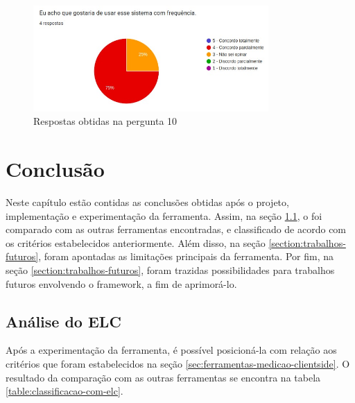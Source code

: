 \documentclass[12pt]{tcc}
\begin{document}
	\begin{figure}[!ht]
		\centering
		\includegraphics[width=0.8\textwidth]{figures/respostas-pergunta-10.jpeg}
		\caption{Respostas obtidas na pergunta 10}
		\label{fig:respostas-pergunta-10}
	\end{figure}

\chapter{Conclusão}
	\label{cap:conclusão}

	Neste capítulo estão contidas as conclusões obtidas após o projeto, implementação e experimentação da ferramenta. Assim, na seção \ref{section:analise-do-elc}, o  foi comparado com as outras ferramentas encontradas, e classificado de acordo com os critérios estabelecidos anteriormente. Além disso, na seção \ref{section:trabalhos-futuros}, foram apontadas as limitações principais da ferramenta. Por fim, na seção \ref{section:trabalhos-futuros}, foram trazidas possibilidades para trabalhos futuros envolvendo o framework, a fim de aprimorá-lo.

	\section{Análise do ELC}
	\label{section:analise-do-elc}

	Após a experimentação da ferramenta, é possível posicioná-la com relação aos critérios que foram estabelecidos na seção \ref{sec:ferramentas-medicao-clientside}. O resultado da comparação com as outras ferramentas se encontra na tabela \ref{table:classificacao-com-elc}.
\end{document}
